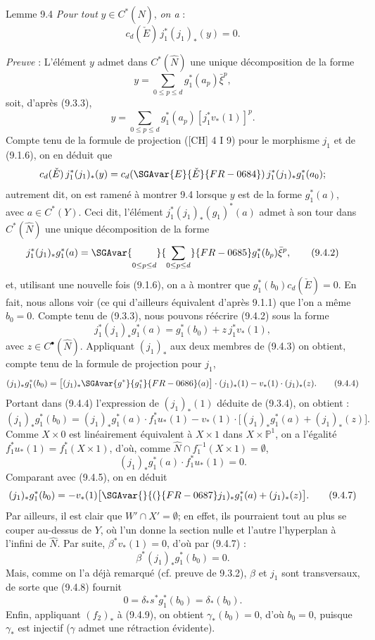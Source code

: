 \begin{statement}{Lemme 9.4}
\emph{Pour tout} $y\in C^*(\widehat N)$, \emph{on a} :
\[
c_d(\check E)\,j_1^*(j_1)_*(y)=0.
\]
\end{statement}

\emph{Preuve} : L'élément $y$ admet dans $C^*(\widehat N)$ une unique décomposition de la forme
\[
y=\sum_{0\le p\le d}g_1^*(a_p)\bar\xi^p,
\]
soit, d'après (9.3.3),
\[
y=\sum_{0\le p\le d}g_1^*(a_p)[j_1^*v_*(1)]^p.
\tag{9.4.1}
\]
Compte tenu de la formule de projection ([CH] 4 I 9) pour le morphisme $j_1$ et de (9.1.6), on en déduit que
\[
c_d(\check E)\,j_1^*(j_1)_*(y)=c_d(\SGAvar{E}{\check E}{FR-0684})\,j_1^*(j_1)_*g_1^*(a_0);
\]
autrement dit, on est ramené à montrer 9.4 lorsque $y$ est de la forme $g_1^*(a)$, avec $a\in C^*(Y)$. Ceci dit, l'élément $j_1^*(j_1)_*(g_1)^*(a)$ admet à son tour dans $C^*(\widehat N)$ une unique décomposition de la forme
\[
j_1^*(j_1)_*g_1^*(a)=\SGAvar{\mathop{\phantom{\sum}}\limits_{0\le p\le d}}{\sum_{0\le p\le d}}{FR-0685}g_1^*(b_p)\bar\xi^p,
\tag{9.4.2}
\]
et,
utilisant une nouvelle fois (9.1.6), on a à montrer que $g_1^*(b_0)c_d(\check E)=0$. En fait, nous allons voir (ce qui d'ailleurs équivalent d'après 9.1.1) que l'on a même $b_0=0$. Compte tenu de (9.3.3), nous pouvons réécrire (9.4.2) sous la forme
\[
j_1^*(j_1)_*g_1^*(a)=g_1^*(b_0)+z\,j_1^*v_*(1),
\tag{9.4.3}
\]
avec $z\in C^{\bullet}(\widehat N)$. Appliquant $(j_1)_*$ aux deux membres de (9.4.3) on obtient, compte tenu de la formule de projection pour $j_1$,
\[
(j_1)_*g_1^*(b_0)=\bigl[(j_1)_*\SGAvar{g^*}{g_1^*}{FR-0686}(a)\bigr]\cdot(j_1)_*(1)-v_*(1)\cdot(j_1)_*(z).
\tag{9.4.4}
\]
Portant dans (9.4.4) l'expression de $(j_1)_*(1)$ déduite de (9.3.4), on obtient :
\[
(j_1)_*g_1^*(b_0)=
(j_1)_*g_1^*(a)\cdot f_1^*u_*(1)-v_*(1)\cdot\bigl[(j_1)_*g_1^*(a)+(j_1)_*(z)\bigr].
\tag{9.4.5}
\]
Comme $X\times0$ est linéairement équivalent à $X\times1$ dans $X\times\mathbb{P}^1$, on a l'égalité $f_1^*u_*(1)=f_1^*(X\times1)$, d'où, comme $\widehat N\cap f_1^{-1}(X\times1)=\emptyset$,
\[
(j_1)_*g_1^*(a)\cdot f_1^*u_*(1)=0.
\tag{9.4.6}
\]
Comparant avec (9.4.5), on en déduit
\[
(j_1)_*g_1^*(b_0)=-v_*(1)\bigl[\SGAvar{}{(}{FR-0687}j_1)_*g_1^*(a)+(j_1)_*(z)\bigr].
\tag{9.4.7}
\]
Par ailleurs, il est clair que $W'\cap X'=\emptyset$; en effet, ils pourraient tout au plus se couper au-dessus de $Y$, où l'un donne la section nulle et l'autre l'hyperplan à l'infini de $\widehat N$. Par suite, $\beta^*v_*(1)=0$, d'où par (9.4.7) :
\[
\beta^*(j_1)_*g_1^*(b_0)=0.
\tag{9.4.8}
\]
Mais, comme on l'a déjà remarqué (cf. preuve de 9.3.2), $\beta$ et $j_1$ sont transversaux, de sorte que (9.4.8) fournit
\[
0=\delta_*s^*g_1^*(b_0)=\delta_*(b_0).
\tag{9.4.9}
\]
Enfin,
appliquant $(f_2)_*$ à (9.4.9), on obtient $\gamma_*(b_0)=0$, d'où $b_0=0$, puisque $\gamma_*$ est injectif ($\gamma$ admet une rétraction évidente).

